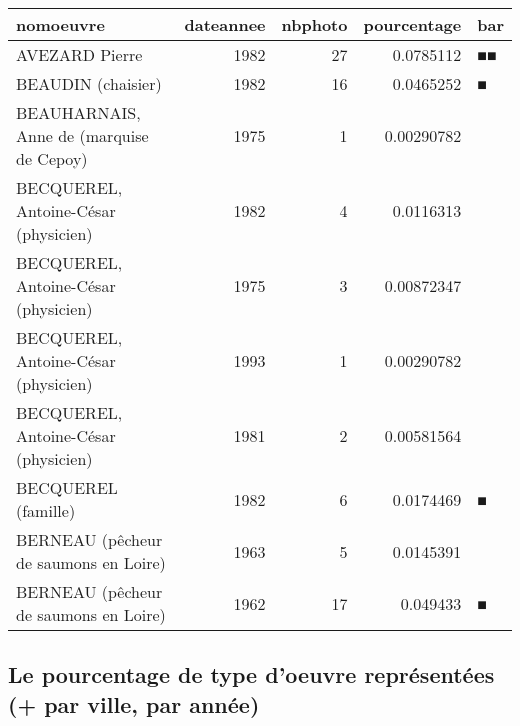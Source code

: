 \documentclass[11pt]{article}
\begin{document}
    \begin{tabular}{lrrrl}
\toprule
 nomoeuvre                                &   dateannee &   nbphoto &   pourcentage & bar   \\
\midrule
 AVEZARD Pierre                           &        1982 &        27 &    0.0785112  & ■■    \\
 BEAUDIN (chaisier)                       &        1982 &        16 &    0.0465252  & ■     \\
 BEAUHARNAIS, Anne de (marquise de Cepoy) &        1975 &         1 &    0.00290782 &       \\
 BECQUEREL, Antoine-César (physicien)     &        1982 &         4 &    0.0116313  &       \\
 BECQUEREL, Antoine-César (physicien)     &        1975 &         3 &    0.00872347 &       \\
 BECQUEREL, Antoine-César (physicien)     &        1993 &         1 &    0.00290782 &       \\
 BECQUEREL, Antoine-César (physicien)     &        1981 &         2 &    0.00581564 &       \\
 BECQUEREL (famille)                      &        1982 &         6 &    0.0174469  & ■     \\
 BERNEAU (pêcheur de saumons en Loire)    &        1963 &         5 &    0.0145391  &       \\
 BERNEAU (pêcheur de saumons en Loire)    &        1962 &        17 &    0.049433   & ■     \\
\bottomrule
\end{tabular}

    
    \hypertarget{le-pourcentage-de-type-doeuvre-repruxe9sentuxe9es-par-ville-par-annuxe9e}{%
\subsection{Le pourcentage de type d'oeuvre représentées (+ par ville,
par
année)}\label{le-pourcentage-de-type-doeuvre-repruxe9sentuxe9es-par-ville-par-annuxe9e}}
\end{document}
